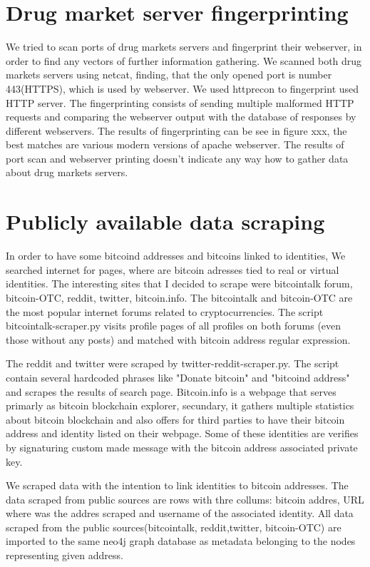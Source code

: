 \documentclass[
  digital, %
  table,   %
  lof,     %
  lot,     %
  oneside
]{fithesis3}
\begin{document}
\section{Drug market server fingerprinting}
We tried to scan ports of drug markets servers and fingerprint their webserver, in order to find any vectors of further information gathering.
We scanned both drug markets servers using netcat, finding, that the only opened port is number 443(HTTPS), which is used by webserver.
We used httprecon to fingerprint used HTTP server. The fingerprinting consists of sending multiple malformed HTTP requests and comparing the webserver output with the database of responses by different webservers.
The results of fingerprinting can be see in figure xxx, the best matches are various modern versions of apache webserver.
The results of port scan and webserver printing doesn't indicate any way how to gather data about drug markets servers.

\section{Publicly available data scraping}
In order to have some bitcoind addresses and bitcoins linked to identities, We searched internet for pages, where are bitcoin adresses tied to real or virtual identities.
The interesting sites that I decided to scrape were bitcointalk forum, bitcoin-OTC, reddit, twitter, bitcoin.info.
The bitcointalk and bitcoin-OTC are the most popular internet forums related to cryptocurrencies. The script bitcointalk-scraper.py visits profile pages of all profiles on both forums (even those without any posts)
 and matched with bitcoin address regular expression.
 
The reddit and twitter were scraped by twitter-reddit-scraper.py. The script contain several hardcoded phrases like "Donate bitcoin" and "bitcoind address" and scrapes the results of search page.
Bitcoin.info is a webpage that serves primarly as bitcoin blockchain explorer, secundary,
it gathers multiple statistics about bitcoin blockchain and also offers for third parties to have their bitcoin address and identity listed on their webpage.
Some of these identities are verifies by signaturing custom made message with the bitcoin address associated private key.

We scraped data with the intention to link identities to bitcoin addresses. The data scraped from public sources are rows with thre collums: bitcoin addres, URL where was the addres scraped and username of the associated identity.
All data scraped from the public sources(bitcointalk, reddit,twitter, bitcoin-OTC) are imported to the same neo4j graph database as metadata belonging to the nodes representing given address.
\end{document}
